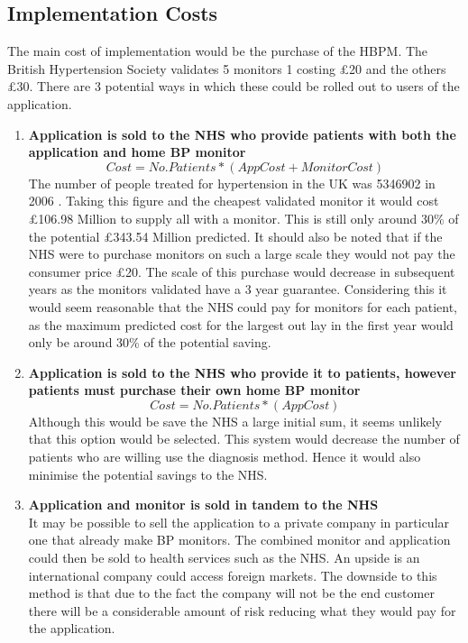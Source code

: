 \documentclass[11pt]{article}
\begin{document}
\subsection{Implementation Costs}

The main cost of implementation would be the purchase of the HBPM. The British Hypertension Society validates 5 monitors 1 costing \pounds 20 and the others \pounds 30. There are 3 potential ways in which these could be rolled out to users of the application.
\begin{enumerate}
\item \textbf{Application is sold to the NHS who provide patients with both the application and home BP monitor}
\\ 
\begin{equation}
Cost=No.Patients * ( AppCost + MonitorCost)
\end{equation}
The number of people treated for hypertension in the UK was 5346902 in 2006 \cite{costdrug}. Taking this figure and the cheapest validated monitor it would cost \pounds 106.98 Million to supply all with a monitor. This is still only around 30\% of the potential \pounds 343.54 Million predicted. It should also be noted that if the NHS were to purchase monitors on such a large scale they would not pay the consumer price \pounds 20. The scale of this purchase would decrease in subsequent years as the monitors validated have a 3 year guarantee. Considering this it would seem reasonable that the NHS could pay for monitors for each patient, as the maximum predicted cost for the largest out lay in the first year would only be around 30\% of the potential saving. 
\item \textbf{Application is sold to the NHS who provide it to patients, however patients must purchase their own home BP monitor}
\begin{equation}
Cost=No.Patients * ( AppCost)
\end{equation}
Although this would be save the NHS a large initial sum, it seems unlikely that this option would be selected. This system would decrease the number of patients who are willing use the diagnosis method. Hence it would also minimise the potential savings to the NHS.
\item \textbf{Application and monitor is sold in tandem to the NHS}
\\
It may be possible to sell the application to a private company in particular one that already make BP monitors. The combined monitor and application could then be sold to health services such as the NHS. An upside is an international company could access foreign markets. The downside to this method is that due to the fact the company will not be the end customer there will be a considerable amount of risk reducing what they would pay for the application.
\end{enumerate}
\end{document}
